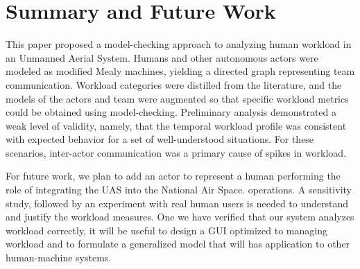 \section{Summary and Future Work}
This paper proposed a model-checking approach to analyzing human workload in an Unmanned Aerial System.  Humans and other autonomous actors were modeled as modified Mealy machines, yielding a directed graph representing team communication.  Workload categories were distilled from the literature, and the models of the actors and team were augmented so that specific workload metrics could be obtained using model-checking.  Preliminary analysis demonstrated a weak level of validity, namely, that the temporal workload profile was consistent with expected behavior for a set of well-understood situations.  For these scenarios, inter-actor communication was a primary cause of spikes in workload. 

For future work, we plan to  add an actor to represent a human performing the role of integrating the UAS into the National Air Space.  operations. A sensitivity study, followed by an experiment with real human users is needed to understand and justify the workload measures. One we have verified that our system analyzes workload correctly, it will be useful to design a GUI optimized to managing workload and to formulate a generalized model that will has application to other human-machine systems.

